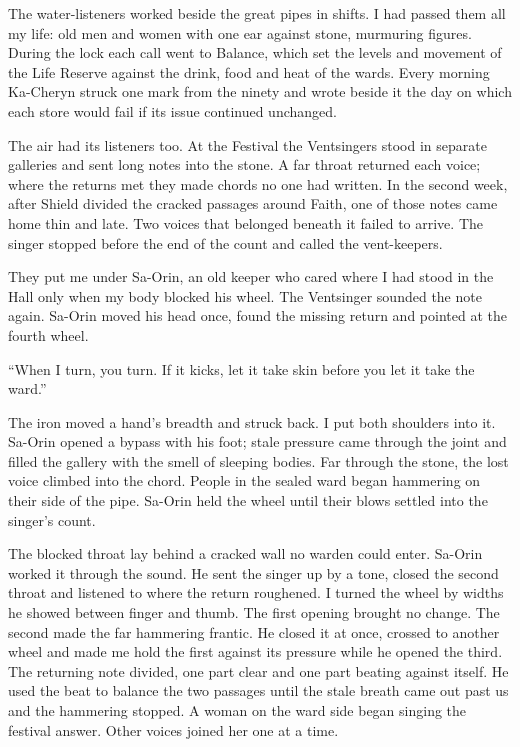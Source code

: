 The water-listeners worked beside the great pipes in shifts. I had passed them all my life: old men and women with one ear against stone, murmuring figures. During the lock each call went to Balance, which set the levels and movement of the Life Reserve against the drink, food and heat of the wards. Every morning Ka-Cheryn struck one mark from the ninety and wrote beside it the day on which each store would fail if its issue continued unchanged.\par

The air had its listeners too. At the Festival the Ventsingers stood in separate galleries and sent long notes into the stone. A far throat returned each voice; where the returns met they made chords no one had written. In the second week, after Shield divided the cracked passages around Faith, one of those notes came home thin and late. Two voices that belonged beneath it failed to arrive. The singer stopped before the end of the count and called the vent-keepers.\par

They put me under Sa-Orin, an old keeper who cared where I had stood in the Hall only when my body blocked his wheel. The Ventsinger sounded the note again. Sa-Orin moved his head once, found the missing return and pointed at the fourth wheel.\par

``When I turn, you turn. If it kicks, let it take skin before you let it take the ward.''\par

The iron moved a hand's breadth and struck back. I put both shoulders into it. Sa-Orin opened a bypass with his foot; stale pressure came through the joint and filled the gallery with the smell of sleeping bodies. Far through the stone, the lost voice climbed into the chord. People in the sealed ward began hammering on their side of the pipe. Sa-Orin held the wheel until their blows settled into the singer's count.\par

The blocked throat lay behind a cracked wall no warden could enter. Sa-Orin worked it through the sound. He sent the singer up by a tone, closed the second throat and listened to where the return roughened. I turned the wheel by widths he showed between finger and thumb. The first opening brought no change. The second made the far hammering frantic. He closed it at once, crossed to another wheel and made me hold the first against its pressure while he opened the third. The returning note divided, one part clear and one part beating against itself. He used the beat to balance the two passages until the stale breath came out past us and the hammering stopped. A woman on the ward side began singing the festival answer. Other voices joined her one at a time.\par

